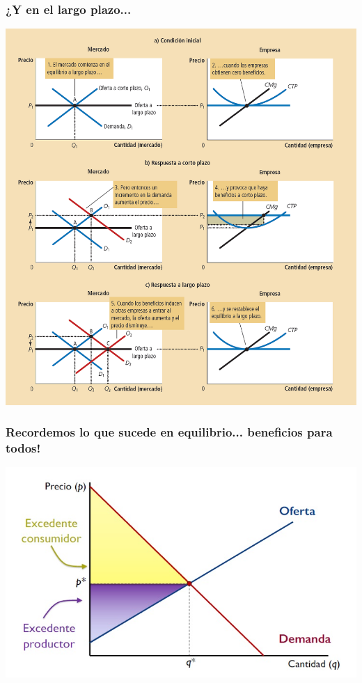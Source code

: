 \documentclass{beamer}
\begin{document}
\begin{frame}
\frametitle{¿Y en el largo plazo...}
\begin{center}
\includegraphics[scale=0.65]{Slides Principios de Economia/Figures/LargoplazoCP.png}
\end{center}
\end{frame}


\begin{frame}
\frametitle{Recordemos lo que sucede en equilibrio... beneficios para todos!}
\begin{center}
\includegraphics[scale=0.55]{Slides Principios de Economia/Figures/Tema_07.23_equilibrioyexcedente.jpg}
\end{center}
\end{frame}
\end{document}

